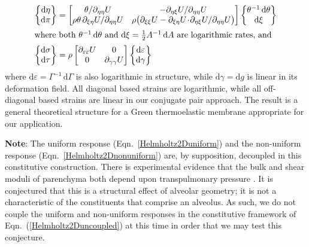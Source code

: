 \begin{subequations}
\label{Helmholtz2Duncoupled}
\begin{align}
\left\{ \begin{matrix}
\mathrm{d} \eta \\ \mathrm{d} \pi 
\end{matrix} \right\} & = \begin{bmatrix}
\theta / \partial_{\eta\eta} U & 
-\partial_{\eta\xi} U / \partial_{\eta\eta} U \\ 
\rho \theta \, \partial_{\xi\eta} U / \partial_{\eta\eta} U & 
\rho \bigl( \partial_{\xi\xi} U - \partial_{\xi\eta} U \!\cdot\! \partial_{\eta\xi} U / \partial_{\eta\eta} U \bigr)  
\end{bmatrix} 
\left\{ \begin{matrix}
\theta^{-1} \, \mathrm{d}\theta \\ \mathrm{d} \xi 
\end{matrix} \right\}
\label{Helmholtz2Duniform} \\
\intertext{where both $\theta^{-1} \, \mathrm{d}\theta$ and $\mathrm{d} \xi = \tfrac{1}{2} A^{-1} \, \mathrm{d}A$ are logarithmic rates, and}
\left\{ \begin{matrix}
    \mathrm{d} \sigma \\ \mathrm{d} \tau
\end{matrix} \right\} & = \rho \begin{bmatrix}
    \partial_{\varepsilon\varepsilon} U & 0 \\
    0 & \partial_{\gamma\gamma} U 
\end{bmatrix} 
\left\{ \begin{matrix}
    \mathrm{d} \varepsilon \\ \mathrm{d} \gamma
\end{matrix} \right\}
\label{Helmholtz2Dnonuniform}
\end{align} 
\end{subequations}
where $\mathrm{d} \varepsilon = \Gamma^{-1} \, \mathrm{d} \Gamma$ is also logarithmic in structure, while $\mathrm{d} \gamma = \mathrm{d} g$ is linear in its deformation field.  All diagonal based strains are logarithmic, while all off-diagonal based strains are linear in our conjugate pair approach.  The result is a general theoretical structure for a Green thermo\-elastic membrane appropriate for our application.

\medskip\noindent
\textbf{Note}:  The uniform response (Eqn.~\ref{Helmholtz2Duniform}) and the non-uniform response (Eqn.~\ref{Helmholtz2Dnonuniform}) are, by supposition, decoupled in this constitutive construction.  There is experimental evidence that the bulk and shear moduli of parenchyma both depend upon transpulmonary pressure \cite{LaiFook79,Jahedetal90}.  It is conjectured that this is a structural effect of alveolar geometry; it is not a characteristic of the constituents that comprise an alveolus.  As such, we do not couple the uniform and non-uniform responses in the constitutive framework of Eqn.~(\ref{Helmholtz2Duncoupled}) at this time in order that we may test this conjecture.


